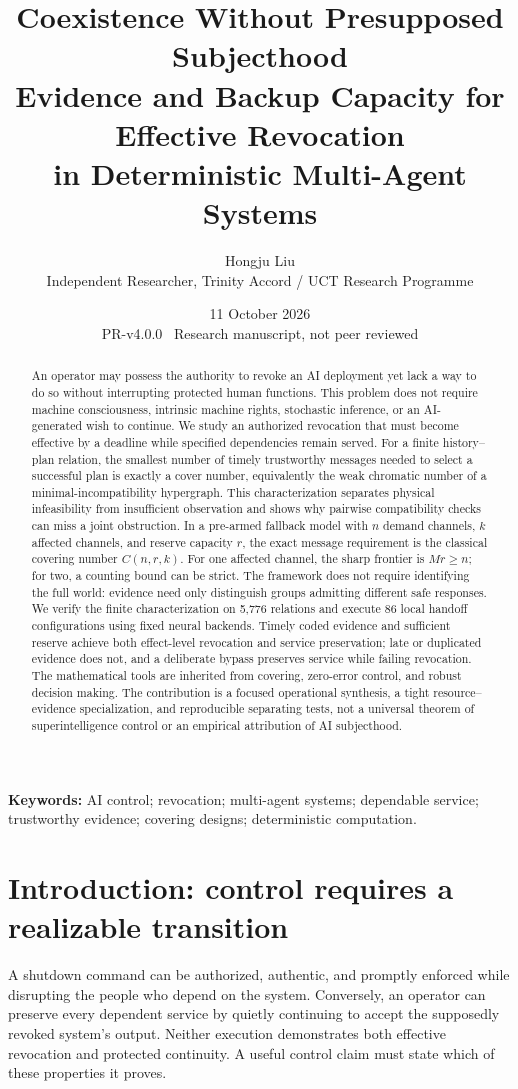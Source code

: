 \documentclass[11pt,a4paper]{article}
\title{\vspace{-1cm}\textbf{Coexistence Without Presupposed Subjecthood}\\[6pt]
\Large Evidence and Backup Capacity for Effective Revocation\\in Deterministic Multi-Agent Systems}
\author{Hongju Liu\\\normalsize Independent Researcher, Trinity Accord / UCT Research Programme}
\date{11 October 2026\\\small PR-v4.0.0 \textbullet\ Research manuscript, not peer reviewed}
\theoremstyle{definition}\newtheorem{definition}{Definition}
\begin{document}
\maketitle\thispagestyle{plain}
\begin{abstract}
An operator may possess the authority to revoke an AI deployment yet lack a way to do so without interrupting protected human functions. This problem does not require machine consciousness, intrinsic machine rights, stochastic inference, or an AI-generated wish to continue. We study an authorized revocation that must become effective by a deadline while specified dependencies remain served. For a finite history--plan relation, the smallest number of timely trustworthy messages needed to select a successful plan is exactly a cover number, equivalently the weak chromatic number of a minimal-incompatibility hypergraph. This characterization separates physical infeasibility from insufficient observation and shows why pairwise compatibility checks can miss a joint obstruction. In a pre-armed fallback model with $n$ demand channels, $k$ affected channels, and reserve capacity $r$, the exact message requirement is the classical covering number $C(n,r,k)$. For one affected channel, the sharp frontier is $Mr\geq n$; for two, a counting bound can be strict. The framework does not require identifying the full world: evidence need only distinguish groups admitting different safe responses. We verify the finite characterization on 5,776 relations and execute 86 local handoff configurations using fixed neural backends. Timely coded evidence and sufficient reserve achieve both effect-level revocation and service preservation; late or duplicated evidence does not, and a deliberate bypass preserves service while failing revocation. The mathematical tools are inherited from covering, zero-error control, and robust decision making. The contribution is a focused operational synthesis, a tight resource--evidence specialization, and reproducible separating tests, not a universal theorem of superintelligence control or an empirical attribution of AI subjecthood.
\end{abstract}
\noindent\textbf{Keywords:} AI control; revocation; multi-agent systems; dependable service; trustworthy evidence; covering designs; deterministic computation.

\section{Introduction: control requires a realizable transition}
A shutdown command can be authorized, authentic, and promptly enforced while disrupting the people who depend on the system. Conversely, an operator can preserve every dependent service by quietly continuing to accept the supposedly revoked system's output. Neither execution demonstrates both effective revocation and protected continuity. A useful control claim must state which of these properties it proves.
\end{document}
